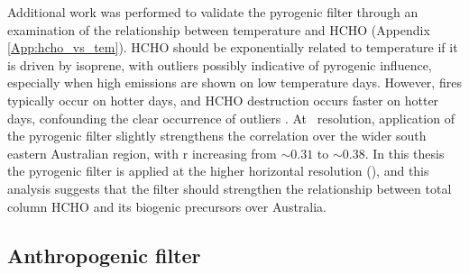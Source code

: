     
    
  
    
    
    Additional work was performed to validate the pyrogenic filter through an examination of the relationship between temperature and HCHO (Appendix \ref{App:hcho_vs_tem}).
    HCHO should be exponentially related to temperature if it is driven by isoprene, with outliers possibly indicative of pyrogenic influence, especially when high emissions are shown on low temperature days.
    However, fires typically occur on hotter days, and HCHO destruction occurs faster on hotter days, confounding the clear occurrence of outliers \parencite[e.g.][]{Zheng2015}. 
    At \highhr ~resolution, application of the pyrogenic filter slightly strengthens the correlation over the wider south eastern Australian region, with r increasing from $\sim{0.31}$ to $\sim{0.38}$.
    In this thesis the pyrogenic filter is applied at the higher horizontal resolution (\highhr), and this analysis suggests that the filter should strengthen the relationship between total column HCHO and its biogenic precursors over Australia.
    
  \subsection{Anthropogenic filter}
    \label{Model:filter:NOx}
    
